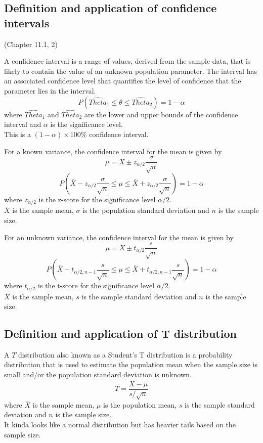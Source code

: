 \documentclass[answers,12pt,addpoints]{exam}
\begin{document}
\subsection*{Definition and application of confidence intervals}
(Chapter 11.1, 2)
\begin{definition}
    A confidence interval is a range of values, derived from the sample data, that is likely to contain the value of an unknown population parameter. The interval has an associated confidence level that quantifies the level of confidence that the parameter lies in the interval.
    $$P(\hat{Theta}_1 \leq \theta \leq \hat{Theta}_2) = 1 - \alpha$$
    where $\hat{Theta}_1$ and $\hat{Theta}_2$ are the lower and upper bounds of the confidence interval and $\alpha$ is the significance level.\\
    This is a $(1-\alpha) \times 100\%$ confidence interval.
\end{definition}
\begin{theorem}
    For a known variance, the confidence interval for the mean is given by
    $$\mu = \bar{X} \pm z_{\alpha/2} \frac{\sigma}{\sqrt{n}}$$
    $$P\left(\bar{X} - z_{\alpha/2} \frac{\sigma}{\sqrt{n}} \leq \mu \leq \bar{X} + z_{\alpha/2} \frac{\sigma}{\sqrt{n}}\right) = 1 - \alpha$$
    where $z_{\alpha/2}$ is the z-score for the significance level $\alpha/2$.\\
    $\bar{X}$ is the sample mean, $\sigma$ is the population standard deviation and $n$ is the sample size.
\end{theorem}
\begin{theorem}
    For an unknown variance, the confidence interval for the mean is given by
    $$\mu = \bar{X} \pm t_{\alpha/2} \frac{s}{\sqrt{n}}$$
    $$P\left(\bar{X} - t_{\alpha/2, n-1} \frac{s}{\sqrt{n}} \leq \mu \leq \bar{X} + t_{\alpha/2, n-1} \frac{s}{\sqrt{n}}\right) = 1 - \alpha$$
    where $t_{\alpha/2}$ is the t-score for the significance level $\alpha/2$.\\
    $\bar{X}$ is the sample mean, $s$ is the sample standard deviation and $n$ is the sample size.
\end{theorem}


\subsection*{Definition and application of T distribution}
\begin{definition}[T distribution]
    A $T$ distribution also known as a Student's T distribution is a probability distribution that is used to estimate the population mean when the sample size is small and/or the population standard deviation is unknown.\\
    $$ T = \frac{\bar{X} - \mu}{s/\sqrt{n}}$$
    where $\bar{X}$ is the sample mean, $\mu$ is the population mean, $s$ is the sample standard deviation and $n$ is the sample size.\\
    It kinda looks like a normal distribution but has heavier tails based on the sample size.
\end{definition}
\end{document}
